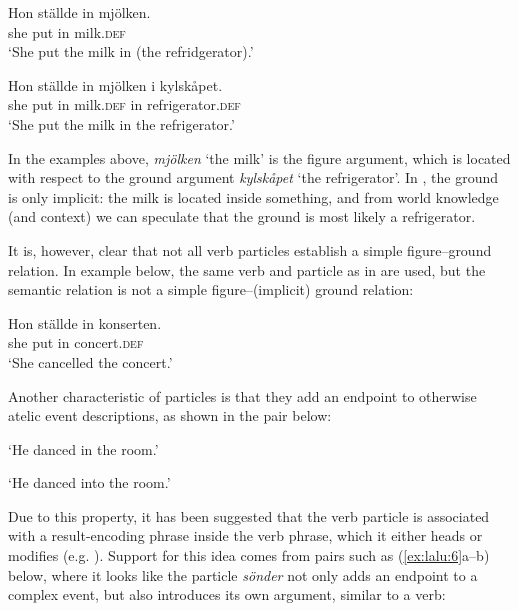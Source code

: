 \documentclass[output=paper]{langscibook}
\begin{document}
\ex\label{ex:lalu:3b}
\gll  Hon   ställde   in  mjölken.\\
  she   put     in   milk.\textsc{def} \\
  \glt `She put the milk in (the refridgerator).’

\ex\label{ex:lalu:3c}
\gll  Hon   ställde   in   mjölken     i     kylskåpet.\\
  she   put     in   milk.\textsc{def}     in     refrigerator.\textsc{def}\\
\glt    ‘She put the milk in the refrigerator.’

\z
\z


In the examples above, \textit{mjölken} ‘the milk’ is the figure argument, which is located with respect to the ground argument \textit{kylskåpet} ‘the refrigerator’. In , the ground is only implicit: the milk is located inside something, and from world knowledge (and context) we can speculate that the ground is most likely a refrigerator.



It is, however, clear that not all verb particles establish a simple figure–ground relation. In example  below, the same verb and particle as in  are used, but the semantic relation is not a simple figure--(implicit) ground relation:


\ea\label{ex:lalu:4}
\gll  Hon   ställde   in   konserten.\\
  she       put         in   concert.\textsc{def}\\
\glt `She cancelled the concert.'

\z

Another characteristic of particles is that they add an endpoint to otherwise atelic event descriptions, as shown in the pair below:


\ea\label{ex:lalu:5}
\glt `He danced in the room.'

\glt `He danced into the room.'

\z
\z

Due to this property, it has been suggested that the verb particle is associated with a result-encoding phrase inside the verb phrase, which it either heads or modifies (e.g. \citealt{RamchandSvenonius2002}). Support for this idea comes from pairs such as (\ref{ex:lalu:6}a–b) below, where it looks like the particle \textit{sönder} not only adds an endpoint to a complex event, but also introduces its own argument, similar to a verb:
\end{document}
